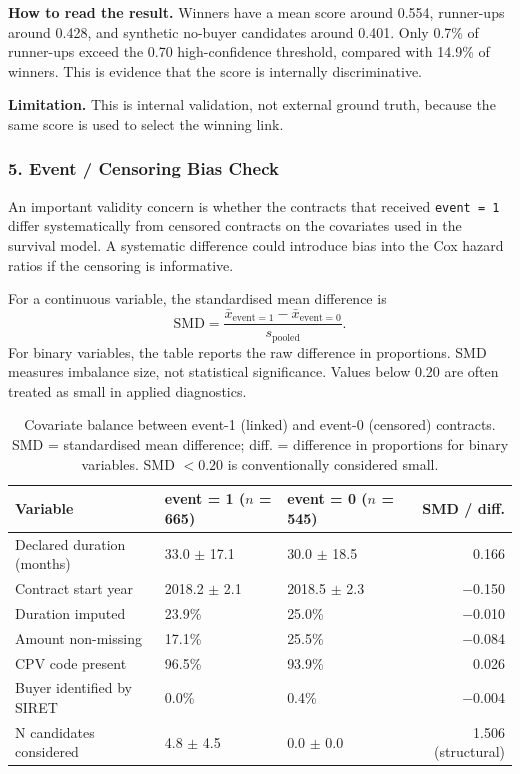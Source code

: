 \documentclass[12pt, a4paper]{article}
\begin{document}
\textbf{How to read the result.} Winners have a mean score around 0.554,
runner-ups around 0.428, and synthetic no-buyer candidates around 0.401. Only
0.7\% of runner-ups exceed the 0.70 high-confidence threshold, compared with
14.9\% of winners. This is evidence that the score is internally
discriminative.

\textbf{Limitation.} This is internal validation, not external ground truth,
because the same score is used to select the winning link.

\subsubsection*{5. Event / Censoring Bias Check}

An important validity concern is whether the contracts that received
\texttt{event = 1} differ systematically from censored contracts on the
covariates used in the survival model. A systematic difference could introduce
bias into the Cox hazard ratios if the censoring is informative.

For a continuous variable, the standardised mean difference is
\[
\mathrm{SMD} = \frac{\bar{x}_{\text{event}=1} - \bar{x}_{\text{event}=0}}{s_{\text{pooled}}}.
\]
For binary variables, the table reports the raw difference in proportions.
SMD measures imbalance size, not statistical significance. Values below 0.20
are often treated as small in applied diagnostics.

\begin{table}[H]
\centering
\caption{Covariate balance between event-1 (linked) and event-0 (censored)
contracts. SMD = standardised mean difference; diff. = difference in
proportions for binary variables. SMD $< 0.20$ is conventionally considered small.}
\label{tab:bias}
\small
\begin{tabular}{@{}p{5.0cm}p{3.0cm}p{3.0cm}r@{}}
\toprule
\textbf{Variable} & \textbf{event = 1 ($n$ = 665)} & \textbf{event = 0 ($n$ = 545)} &
\textbf{SMD / diff.} \\
\midrule
Declared duration (months) & 33.0 $\pm$ 17.1 & 30.0 $\pm$ 18.5 & 0.166 \\
Contract start year        & 2018.2 $\pm$ 2.1 & 2018.5 $\pm$ 2.3 & $-$0.150 \\
Duration imputed           & 23.9\%           & 25.0\%           & $-$0.010 \\
Amount non-missing         & 17.1\%           & 25.5\%           & $-$0.084 \\
CPV code present           & 96.5\%           & 93.9\%           & 0.026 \\
Buyer identified by SIRET  & 0.0\%            & 0.4\%            & $-$0.004 \\
\midrule
N candidates considered    & 4.8 $\pm$ 4.5  & 0.0 $\pm$ 0.0  & 1.506 (structural) \\
\bottomrule
\end{tabular}
\end{table}
\end{document}

